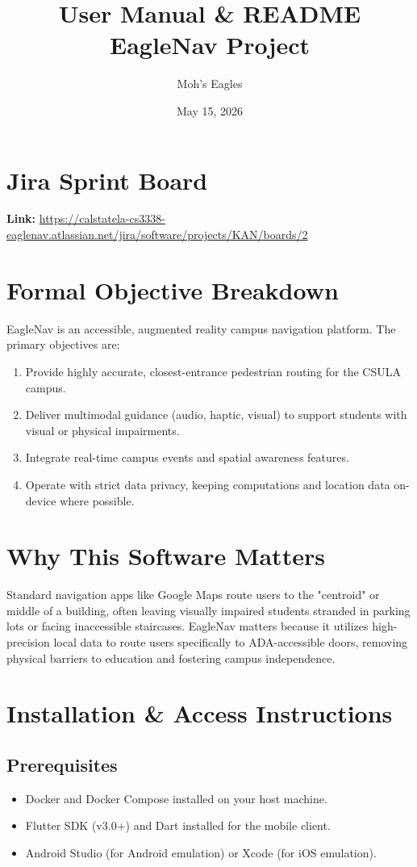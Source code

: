 \documentclass[12pt]{article}
\title{\textbf{User Manual \& README}\\ \large EagleNav Project}
\author{Moh's Eagles}
\date{May 15, 2026}
\begin{document}
\maketitle

\section{Jira Sprint Board}
\textbf{Link:} \url{https://calstatela-cs3338-eaglenav.atlassian.net/jira/software/projects/KAN/boards/2}

\section{Formal Objective Breakdown}
EagleNav is an accessible, augmented reality campus navigation platform. The primary objectives are:
\begin{enumerate}
    \item Provide highly accurate, closest-entrance pedestrian routing for the CSULA campus.
    \item Deliver multimodal guidance (audio, haptic, visual) to support students with visual or physical impairments.
    \item Integrate real-time campus events and spatial awareness features.
    \item Operate with strict data privacy, keeping computations and location data on-device where possible.
\end{enumerate}

\section{Why This Software Matters}
Standard navigation apps like Google Maps route users to the "centroid" or middle of a building, often leaving visually impaired students stranded in parking lots or facing inaccessible staircases. EagleNav matters because it utilizes high-precision local data to route users specifically to ADA-accessible doors, removing physical barriers to education and fostering campus independence.

\section{Installation \& Access Instructions}
\subsection{Prerequisites}
\begin{itemize}
    \item Docker and Docker Compose installed on your host machine.
    \item Flutter SDK (v3.0+) and Dart installed for the mobile client.
    \item Android Studio (for Android emulation) or Xcode (for iOS emulation).
\end{itemize}
\end{document}
